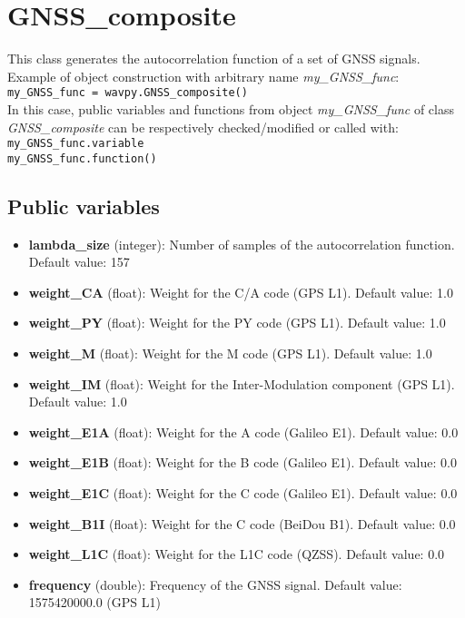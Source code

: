 \chapter{GNSS\_composite}\label{cha:gnss}

This class generates the autocorrelation function of a set of GNSS signals.\\

Example of object construction with arbitrary name {\it my\_GNSS\_func}:\\

\texttt{my\_GNSS\_func = wavpy.GNSS\_composite()}\\

In this case, public variables and functions from object {\it my\_GNSS\_func} of class {\it GNSS\_composite} can be respectively checked/modified or called with:\\

\texttt{my\_GNSS\_func.variable}\\

\texttt{my\_GNSS\_func.function()}\\


\section{Public variables}

\begin{itemize}
\item {\bf lambda\_size} (integer): Number of samples of the autocorrelation function. Default value: 157

\item {\bf weight\_CA} (float): Weight for the C/A code (GPS L1). Default value: 1.0

\item {\bf weight\_PY} (float): Weight for the PY code (GPS L1). Default value: 1.0

\item {\bf weight\_M} (float): Weight for the M code (GPS L1). Default value: 1.0

\item {\bf weight\_IM} (float): Weight for the Inter-Modulation component (GPS L1). Default value: 1.0

\item {\bf weight\_E1A} (float): Weight for the A code (Galileo E1). Default value: 0.0

\item {\bf weight\_E1B} (float): Weight for the B code (Galileo E1). Default value: 0.0

\item {\bf weight\_E1C} (float): Weight for the C code (Galileo E1). Default value: 0.0

\item {\bf weight\_B1I} (float): Weight for the C code (BeiDou B1). Default value: 0.0

\item {\bf weight\_L1C} (float): Weight for the L1C code (QZSS). Default value: 0.0

\item {\bf frequency} (double): Frequency of the GNSS signal. Default value: 1575420000.0 (GPS L1)
\end{itemize}

